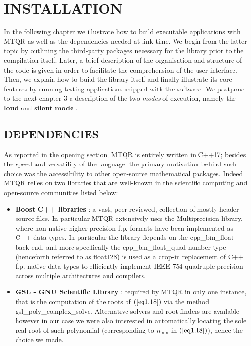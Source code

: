 \documentclass[a4paper, twosided]{book}
\begin{document}
\chapter[Installation]{\Huge \ttfamily INSTALLATION}

In the following chapter we illustrate how to build executable applications with MTQR as well as the dependencies needed at link-time. We begin from the latter topic by outlining the third-party packages necessary for the library prior to the compilation itself. Later, a brief description of the organisation and structure of the code is given in order to facilitate the comprehension of the user interface. Then, we explain how to build the library itself and finally illustrate its core features by running testing applications shipped with the software. We postpone to the next chapter 3 a description of the two {\itshape modes} of execution, namely the \color{poliDarkBlue} \textbf{loud} \color{black} and \color{poliDarkBlue} \textbf{silent mode} \color{black}.

\section[Dependencies]{\changefont DEPENDENCIES}\label{Sec2.1}

\noindent
As reported in the opening section, MTQR is entirely written in C++17; besides the speed and versatility of the language, the primary motivation behind such choice was the accessibility to other open-source mathematical packages. Indeed MTQR relies on two libraries that are well-known in the scientific computing and open-source communities listed below:

\begin{itemize}
    \item \color{poliDarkBlue} \textbf{Boost C++ libraries} \color{black}\cite{boost}: a vast, peer-reviewed, collection of mostly header source files. In particular MTQR extensively uses the \colorbox{poliGrayBlue}{Multiprecision} library, where non-native higher precision f.p. formats have been implemented as C++ data-types. In particular the library depends on the \colorbox{poliGrayBlue}{cpp\_bin\_float} back-end, and more specifically the \colorbox{poliGrayBlue}{cpp\_bin\_float\_quad} number type (henceforth referred to as \colorbox{poliGrayBlue}{float128}) is used as a drop-in replacement of C++ f.p. native data types to efficiently implement IEEE 754 quadruple precision across multiple architectures and compilers.
    \item \color{poliDarkBlue} \textbf{GSL - GNU Scientific Library} \color{black}\cite{gsl}: required by MTQR in only one instance, that is the computation of the roots of $(\ref{eq1.18})$ via the method \colorbox{poliGrayBlue}{gsl\_poly\_complex\_solve}. Alternative solvers and root-finders are available however in our case we were also interested in automatically locating the sole real root of such polynomial (corresponding to $n_{\text{min}}$ in $(\ref{eq1.18})$), hence the choice we made.
\end{itemize}
\end{document}
